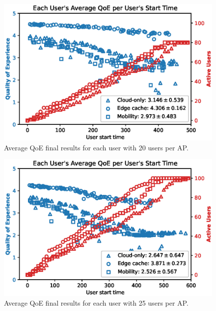 \begin{figure}[!h]
    \centering
    \includegraphics[width=\linewidth]{images/UserQoExUserStartTime20users.eps}
    \vspace{-0.7cm}
    \caption{Average QoE final results for each user with 20 users per AP.}
    \label{fig:exp-setup-20}
\end{figure}

\begin{figure}[!h]
    \centering
    \includegraphics[width=\linewidth]{images/UserQoExUserStartTime25users.eps}
    \vspace{-0.7cm}
    \caption{Average QoE final results for each user with 25 users per AP.}
    \label{fig:exp-setup-25}
\end{figure}

